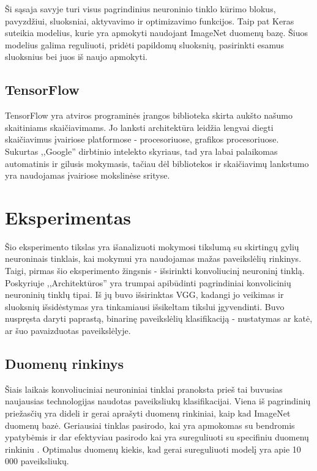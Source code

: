 \documentclass{VUMIFPSkursinis}
\begin{document}
Ši sąsaja savyje turi visus pagrindinius neuroninio tinklo kūrimo blokus, pavyzdžiui, sluoksniai, aktyvavimo ir optimizavimo funkcijos. Taip pat Keras suteikia modelius, 
kurie yra apmokyti naudojant ImageNet duomenų bazę. Šiuos modelius galima reguliuoti, pridėti papildomų sluoksnių, pasirinkti esamus sluoksnius bei juos iš naujo apmokyti.

\subsection{TensorFlow}
TensorFlow yra atviros programinės įrangos biblioteka skirta aukšto našumo skaitiniams skaičiavimams. Jo lanksti architektūra leidžia lengvai diegti skaičiavimus įvairiose 
platformose - procesoriuose, grafikos procesoriuose. Sukurtas ,,Google'' dirbtinio intelekto skyriaus, tad yra labai palaikomas automatinis ir gilusis mokymasis, tačiau 
dėl bibliotekos ir skaičiavimų lankstumo yra naudojamas įvairiose mokslinėse srityse.

\section{Eksperimentas}
Šio eksperimento tikslas yra išanalizuoti mokymosi tikslumą su skirtingų gylių neuroninais tinklais, kai mokymui yra naudojamas mažas paveikslėlių rinkinys. Taigi, pirmas 
šio eksperimento žingsnis - išsirinkti konvoliucinį neuroninį tinklą. Poskyriuje ,,Architektūros'' yra trumpai apibūdinti pagrindiniai konvolicinių neuroninių tinklų tipai. 
Iš jų buvo išsirinktas VGG, kadangi jo veikimas ir sluoksnių išsidėstymas yra tinkamiausi išsikeltam tikslui įgyvendinti. Buvo nuspręsta daryti paprastą, binarinę paveikslėlių 
klasifikaciją - nustatymas ar katė, ar šuo pavaizduotas paveikslėlyje.

\subsection{Duomenų rinkinys}
Šiais laikais konvoliuciniai neuroniniai tinklai pranoksta prieš tai buvusias naujausias technologijas naudotas paveiksliukų klasifikacijai. Viena iš pagrindinių priežasčių 
yra dideli ir gerai aprašyti duomenų rinkiniai, kaip kad ImageNet duomenų bazė. Geriausiai tinklas pasirodo, kai yra apmokomas su bendromis ypatybėmis ir dar efektyviau 
pasirodo kai yra sureguliuoti su specifiniu duomenų rinkiniu \cite{DBLP:conf/eccv/ChuMBHD16}. Optimalus duomenų kiekis, kad gerai sureguliuoti 
modelį yra apie 10 000 paveiksliukų. 
\end{document}
